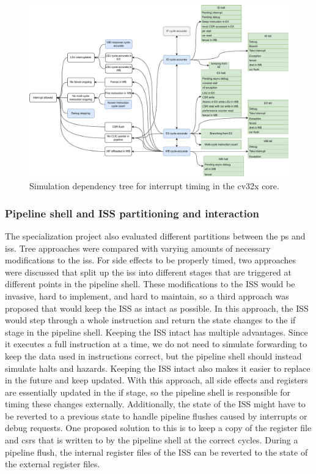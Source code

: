 \begin{figure}[htb]
    \centering
    \includegraphics[width=0.8\linewidth]{figures/Dependencies.pdf}
    \caption{Simulation dependency tree for interrupt timing in the \gls{cv32x} core.}
    \label{fig:dependency-tree-cv32x}
\end{figure}

\subsubsection{Pipeline shell and ISS partitioning and interaction}

The specialization project also evaluated different partitions between the \gls{ps} and \acrshort{iss}. Tree approaches were compared with varying amounts of necessary modifications to the \acrshort{iss}. For side effects to be properly timed, two approaches were discussed that split up the \acrshort{iss} into different stages that are triggered at different points in the pipeline shell. These modifications to the ISS would be invasive, hard to implement, and hard to maintain, so a third approach was proposed that would keep the ISS as intact as possible. In this approach, the ISS would step through a whole instruction and return the state changes to the \acrshort{if} stage in the pipeline shell. Keeping the ISS intact has multiple advantages. Since it executes a full instruction at a time, we do not need to simulate forwarding to keep the data used in instructions correct, but the pipeline shell should instead simulate halts and hazards. Keeping the ISS intact also makes it easier to replace in the future and keep updated. With this approach, all side effects and registers are essentially updated in the \acrshort{if} stage, so the pipeline shell is responsible for timing these changes externally. Additionally, the state of the ISS might have to be reverted to a previous state to handle pipeline flushes caused by interrupts or debug requests. One proposed solution to this is to keep a copy of the register file and \acrshort{csr}s that is written to by the pipeline shell at the correct cycles. During a pipeline flush, the internal register files of the ISS can be reverted to the state of the external register files.


